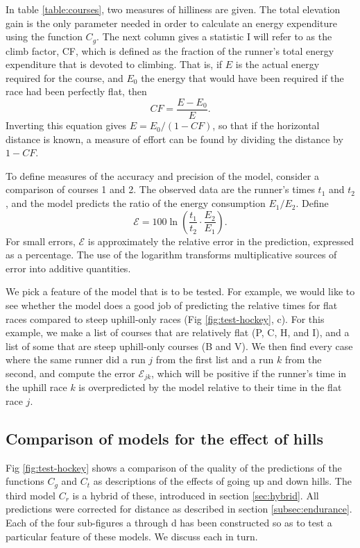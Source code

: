 \documentclass[10pt,letterpaper]{article}
\begin{document}
In table \ref{table:courses}, two measures of hilliness are given. The total elevation gain
is the only parameter needed in order to calculate an energy expenditure using the function
$C_g$. The next column gives a statistic I will refer to as the climb factor, CF, which is
defined as the fraction of the runner's total energy expenditure that is devoted to climbing.
That is, if $E$ is the actual energy required for the course, and $E_0$ the energy that
would have been required if the race had been perfectly flat, then 
\begin{equation}
  CF=\frac{E-E_0}{E}.
\end{equation}
Inverting this equation gives $E=E_0/(1-CF)$, so that if the horizontal distance is
known, a measure of effort can be found by dividing the distance by $1-CF$.

To define measures of the accuracy and precision of the model, consider a comparison
of courses 1 and 2. The observed data are the runner's times $t_1$ and $t_2$, and
the model predicts the ratio of the energy consumption $E_1/E_2$. Define
\begin{equation}\label{eq:define-e}
  \mathcal{E} = 100 \ln\left(\frac{t_1}{t_2}\cdot\frac{E_2}{E_1}\right).
\end{equation}
For small errors, $\mathcal{E}$ is approximately the relative error in the prediction, expressed
as a percentage. The use of the logarithm transforms multiplicative sources of
error into additive quantities.

We pick a feature of the model that is to be tested. For example, we would like to see
whether the model does a good job of predicting the relative times for flat races
compared to steep uphill-only races (Fig \ref{fig:test-hockey}, c). For this example, we make a list of courses
that are relatively flat (P, C, H, and I), and a list of some that are steep uphill-only
courses (B and V). We then find every case where the same runner did a run $j$ from the first
list and a run $k$ from the second, and compute the error $\mathcal{E}_{jk}$, which will be
positive if the runner's time in the uphill race $k$ is overpredicted by the model relative
to their time in the flat race $j$.

\subsection{Comparison of models for the effect of hills}

Fig \ref{fig:test-hockey} shows a comparison of the quality of the predictions of the functions
$C_g$ and $C_t$ as descriptions of the effects of going up and down hills.
The third model $C_r$ is a hybrid of these, introduced in section \ref{sec:hybrid}.
All predictions were corrected for distance as described in section \ref{subsec:endurance}.
Each of the four sub-figures a through d has been constructed so as to test a particular
feature of these models. We discuss each in turn.
\end{document}
